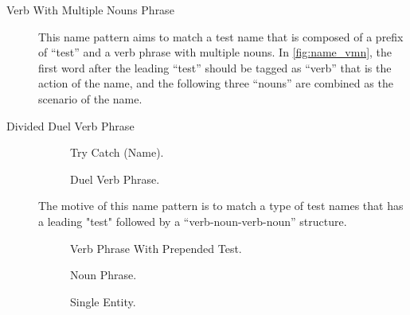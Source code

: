 \documentclass[proposal.tex]{subfiles}
\begin{document}
\begin{description}

\item[Verb With Multiple Nouns Phrase]

This name pattern aims to match a test name that is composed of a prefix of \enquote{test} and a verb phrase with multiple nouns.
%
In \cref{fig:name_vmn}, the first word after the leading \enquote{test} should be tagged as \enquote{verb} that is the action of the name, and the following three \enquote{nouns} are combined as the scenario of the name.

\item[Divided Duel Verb Phrase]

\begin{figure}[t]
\centering
    \begin{subfigure}{0.65\textwidth}
    \end{subfigure}
\caption{Try Catch (Name).}
\label{fig:try-catch}
\end{figure}

\begin{figure}[t]
\centering
    \begin{subfigure}{0.65\textwidth}
    \end{subfigure}
\caption{Duel Verb Phrase.}
\label{fig:dual-verb}
\end{figure}


The motive of this name pattern is to match a type of test names that has a leading "test" followed by a \enquote{verb-noun-verb-noun} structure.

\begin{figure}[H]
\centering
    \begin{subfigure}{0.65\textwidth}
    \end{subfigure}
\caption{Verb Phrase With Prepended Test.}
\label{fig:verb-with-test}
\end{figure}

\begin{figure}[H]
\centering
     \begin{subfigure}{0.65\textwidth}
    \end{subfigure}
\caption{Noun Phrase.}
 \label{fig:noun-phrase}
\end{figure}

\begin{figure}[H]
\centering
     \begin{subfigure}{0.65\textwidth}
    \end{subfigure}
\caption{Single Entity.}
\label{fig:single-entity}
\end{figure}


\end{description}
\end{document}

